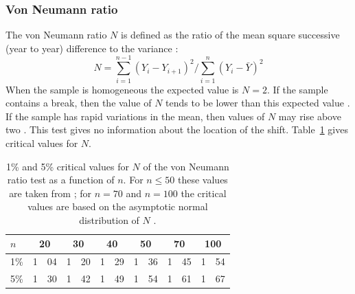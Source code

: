 \documentclass[a4paper,11pt]{article}
\begin{document}
\subsubsection{Von Neumann ratio}
\label{sec:neu}

The von Neumann ratio $N$ is defined as the ratio of the mean square
successive (year to year) difference to the variance
\citep{vonneumann}:
\begin{equation*}
N = \sum_{i=1}^{n-1}(Y_i - Y_{i+1})^2 / \sum_{i=1}^{n}(Y_i - \bar{Y})^2
\end{equation*}
When the sample is homogeneous the expected value is $N=2$. If the
sample contains a break, then the value of $N$ tends to be lower than
this expected value \citep{buishand1981}. If the sample has rapid
variations in the mean, then values of $N$ may rise above two
\citep{bingham}. This test gives no information about the location of
the shift. Table~\ref{tab:vonneumann} gives critical values for $N$.


\begin{table}[!ht]
\begin{center}
\caption{1\% and 5\% critical values for $N$ of the von Neumann ratio
test as a function of $n$. For $n \leq 50$ these values are taken from
\citet{owen}; for $n=70$ and $n=100$ the critical values are based on
the asymptotic normal distribution of $N$ \citep{buishand1981}.}
\label{tab:vonneumann}
\begin{tabular}{l r@{.}l r@{.}l r@{.}l r@{.}l r@{.}l r@{.}l}
\hline
$n$ & \multicolumn{2}{c}{20} & \multicolumn{2}{c}{30} & \multicolumn{2}{c}{40} & \multicolumn{2}{c}{50} & \multicolumn{2}{c}{70} & \multicolumn{2}{c}{100}\\
\hline
1\% & 1&04 & 1&20 & 1&29 & 1&36 & 1&45 & 1&54 \\
5\% & 1&30 & 1&42 & 1&49 & 1&54 & 1&61 & 1&67 \\
\end{tabular}
\end{center}
\end{table}
\end{document}

